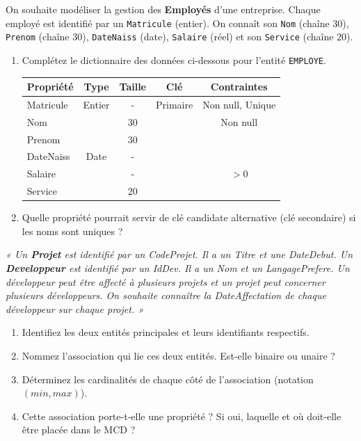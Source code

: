 \documentclass[11pt]{article}
\begin{document}
\begin{exercice}
On souhaite modéliser la gestion des \textbf{Employés} d'une entreprise. Chaque employé est identifié par un \texttt{Matricule} (entier). On connaît son \texttt{Nom} (chaîne 30), \texttt{Prenom} (chaîne 30), \texttt{DateNaiss} (date), \texttt{Salaire} (réel) et son \texttt{Service} (chaîne 20).
\begin{enumerate}
    \item Complétez le dictionnaire des données ci-dessous pour l'entité \texttt{EMPLOYE}.
    \begin{tabular}{|l|c|c|c|c|}
    \hline
    \textbf{Propriété} & \textbf{Type} & \textbf{Taille} & \textbf{Clé} & \textbf{Contraintes} \\
    \hline
    Matricule & Entier & - & Primaire & Non null, Unique \\
    \hline
    Nom & & 30 & & Non null \\
    \hline
    Prenom & & 30 & & \\
    \hline
    DateNaiss & Date & - & & \\
    \hline
    Salaire & & - & & $> 0$ \\
    \hline
    Service & & 20 & & \\
    \hline
    \end{tabular}
    \item Quelle propriété pourrait servir de clé candidate alternative (clé secondaire) si les noms sont uniques ?
\end{enumerate}
\end{exercice}

\begin{exercice}
\textit{« Un \textbf{Projet} est identifié par un CodeProjet. Il a un Titre et une DateDebut. Un \textbf{Developpeur} est identifié par un IdDev. Il a un Nom et un LangagePrefere. Un développeur peut être affecté à plusieurs projets et un projet peut concerner plusieurs développeurs. On souhaite connaître la DateAffectation de chaque développeur sur chaque projet. »}
\begin{enumerate}
    \item Identifiez les deux entités principales et leurs identifiants respectifs.
    \item Nommez l'association qui lie ces deux entités. Est-elle binaire ou unaire ?
    \item Déterminez les cardinalités de chaque côté de l'association (notation $(min, max)$).
    \item Cette association porte-t-elle une propriété ? Si oui, laquelle et où doit-elle être placée dans le MCD ?
\end{enumerate}
\end{exercice}
\end{document}
